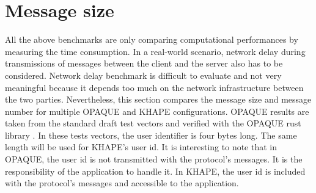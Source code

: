 \documentclass[../report.tex]{subfiles}
\begin{document}



\section{Message size} \label{sec:comp_message_size}
All the above benchmarks are only comparing computational performances by measuring the time consumption. In a real-world scenario, network delay during transmissions of messages between the client and the server also has to be considered. Network delay benchmark is difficult to evaluate and not very meaningful because it depends too much on the network infrastructure between the two parties.
Nevertheless, this section compares the message size and message number for multiple OPAQUE and KHAPE configurations.
OPAQUE results are taken from the standard draft test vectors and verified with the OPAQUE rust library \cite{OPAQUE_KE_lib}. In these tests vectors, the user identifier is four bytes long. The same length will be used for KHAPE's user id. It is interesting to note that in OPAQUE, the user id is not transmitted with the protocol's messages. It is the responsibility of the application to handle it. In KHAPE, the user id is included with the protocol's messages and accessible to the application.
\end{document}
